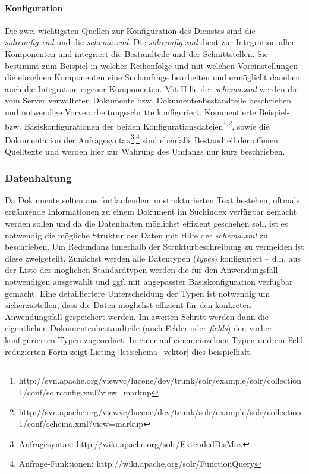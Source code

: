 \paragraph{Konfiguration} Die zwei wichtigsten Quellen zur Konfiguration des Dienstes sind die \textit{solrconfig.xml} und die \textit{schema.xml}. Die \textit{solrconfig.xml} dient zur Integration aller Komponenten und integriert die Bestandteile und der Schnittstellen. Sie bestimmt zum Beispiel in welcher Reihenfolge und mit welchen Voreinstellungen die einzelnen Komponenten eine Suchanfrage bearbeiten und ermöglicht daneben auch die Integration eigener Komponenten. Mit Hilfe der  \textit{schema.xml} werden die vom Server verwalteten Dokumente bzw. Dokumentenbestandteile beschrieben und notwendige Vorverarbeitungsschritte konfiguriert. Kommentierte Beispiel- bzw. Basiskonfigurationen der beiden Konfigurationsdateien\footnote{\tiny{http://svn.apache.org/viewvc/lucene/dev/trunk/solr/example/solr/collection1/conf/solrconfig.xml?view=markup}}\textsuperscript{,}\footnote{\tiny{http://svn.apache.org/viewvc/lucene/dev/trunk/solr/example/solr/collection1/conf/schema.xml?view=markup}}, sowie die Dokumentation der Anfragesyntax\footnote{\tiny{Anfragesyntax: http://wiki.apache.org/solr/ExtendedDisMax}}\textsuperscript{,}\footnote{\tiny{Anfrage-Funktionen: http://wiki.apache.org/solr/FunctionQuery}} sind ebenfalls Bestandteil der offenen Quelltexte und werden hier zur Wahrung des Umfangs nur kurz beschrieben.

\subsubsection{Datenhaltung}

Da Dokumente selten aus fortlaufendem unstrukturierten Text bestehen, oftmals ergänzende Informationen zu einem Dokument im Suchindex verfügbar gemacht werden sollen und da die Datenhalten möglichst effizient geschehen soll, ist es notwendig die mögliche Struktur der Daten mit Hilfe der \textit{schema.xml} zu beschrieben. Um Redundanz innerhalb der Strukturbeschreibung zu vermeiden ist diese zweigeteilt. Zunächst werden alle Datentypen (\textit{types}) konfiguriert -- d.h. aus der Liste der möglichen Standardtypen werden die für den Anwendungsfall notwendigen ausgewählt und ggf. mit angepasster Basiskonfiguration verfügbar gemacht. Eine detailliertere Unterscheidung der Typen ist notwendig um sicherzustellen, dass die Daten möglichst effizient für den konkreten Anwendungsfall gespeichert werden. Im zweiten Schritt werden dann die eigentlichen Dokumentenbestandteile (auch Felder oder \textit{fields}) den vorher konfigurierten Typen zugeordnet. In einer auf einen einzelnen Typen und ein Feld reduzierten Form zeigt Listing \ref{lst:schema_vektor} dies beispielhaft.

